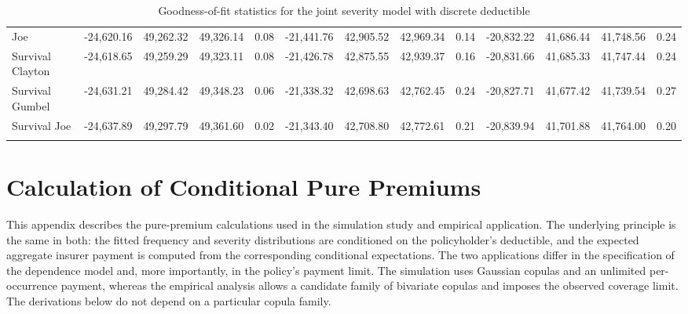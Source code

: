 \documentclass[11pt]{article}
\begin{document}
{\begin{table}[!h]
{\begin{tabular}[t]{lrrrrrrrrrrrr}
Joe & -24,620.16 & 49,262.32 & 49,326.14 & 0.08 & -21,441.76 & 42,905.52 & 42,969.34 & 0.14 & -20,832.22 & 41,686.44 & 41,748.56 & 0.24 \\
Survival Clayton & -24,618.65 & 49,259.29 & 49,323.11 & 0.08 & -21,426.78 & 42,875.55 & 42,939.37 & 0.16 & -20,831.66 & 41,685.33 & 41,747.44 & 0.24 \\
Survival Gumbel & -24,631.21 & 49,284.42 & 49,348.23 & 0.06 & -21,338.32 & 42,698.63 & 42,762.45 & 0.24 & -20,827.71 & 41,677.42 & 41,739.54 & 0.27 \\
Survival Joe & -24,637.89 & 49,297.79 & 49,361.60 & 0.02 & -21,343.40 & 42,708.80 & 42,772.61 & 0.21 & -20,839.94 & 41,701.88 & 41,764.00 & 0.20 \\
\hhline{=============}
\end{tabular}}
\caption{Goodness-of-fit statistics for the joint severity model with discrete deductible}
\label{tab:sdmcopula}
\end{table}

% 

\section{Calculation of Conditional Pure Premiums}
\label{app:conditional-pure-premiums}

This appendix describes the pure-premium calculations used in the simulation
study and empirical application. The underlying principle is the same in both:
the fitted frequency and severity distributions are conditioned on the
policyholder's deductible, and the expected aggregate insurer payment is
computed from the corresponding conditional expectations. The two applications
differ in the specification of the dependence model and, more importantly, in
the policy's payment limit. The simulation uses Gaussian copulas and an
unlimited per-occurrence payment, whereas the empirical analysis allows a
candidate family of bivariate copulas and imposes the observed coverage limit.
The derivations below do not depend on a particular copula family.

}
\end{document}
